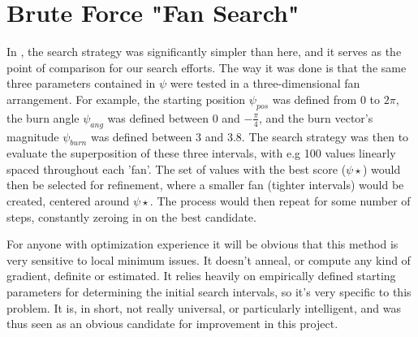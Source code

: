 \section{Brute Force "Fan Search"}
In \cite{Saxe2015}, the search strategy was significantly simpler than here, and it serves as the point of comparison for our search efforts. The way it was done is that the same three parameters contained in $\psi$ were tested in a three-dimensional fan arrangement. For example, the starting position $\psi_{pos}$ was defined from 0 to $2\pi$, the burn angle $\psi_{ang}$ was defined between 0 and $-\frac{\pi}{4}$, and the burn vector's magnitude $\psi_{burn}$ was defined between 3 and 3.8. The search strategy was then to evaluate the superposition of these three intervals, with e.g 100 values linearly spaced throughout each 'fan'. The set of values with the best score ($\psi\star$) would then be selected for refinement, where a smaller fan (tighter intervals) would be created, centered around $\psi\star$. The process would then repeat for some number of steps, constantly zeroing in on the best candidate.

For anyone with optimization experience it will be obvious that this method is very sensitive to local minimum issues. It doesn't anneal, or compute any kind of gradient, definite or estimated. It relies heavily on empirically defined starting parameters for determining the initial search intervals, so it's very specific to this problem. It is, in short, not really universal, or particularly intelligent, and was thus seen as an obvious candidate for improvement in this project.